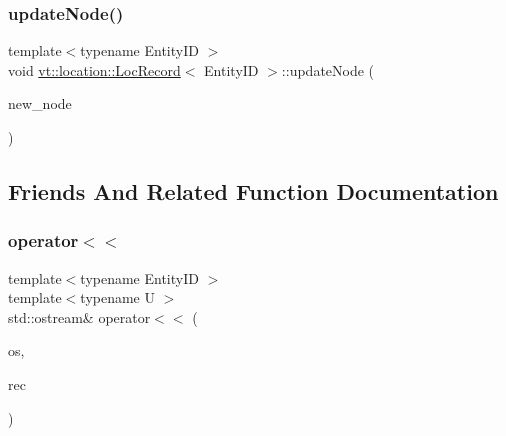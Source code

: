 \mbox{\label{structvt_1_1location_1_1_loc_record_aa66e4f13e89526636b87b3c950bdd91c}} 
\subsubsection{\texorpdfstring{update\+Node()}{updateNode()}}
{\footnotesize\ttfamily template$<$typename Entity\+ID $>$ \\
void \hyperlink{structvt_1_1location_1_1_loc_record}{vt\+::location\+::\+Loc\+Record}$<$ Entity\+ID $>$\+::update\+Node (\begin{DoxyParamCaption}\item[{\hyperlink{namespacevt_a866da9d0efc19c0a1ce79e9e492f47e2}{Node\+Type} const \&}]{new\+\_\+node }\end{DoxyParamCaption})}



\subsection{Friends And Related Function Documentation}
\mbox{\label{structvt_1_1location_1_1_loc_record_ac94f95ab9e7fa58002314e99696972d7}} 
\subsubsection{\texorpdfstring{operator$<$$<$}{operator<<}}
{\footnotesize\ttfamily template$<$typename Entity\+ID $>$ \\
template$<$typename U $>$ \\
std\+::ostream\& operator$<$$<$ (\begin{DoxyParamCaption}\item[{std\+::ostream \&}]{os,  }\item[{\hyperlink{structvt_1_1location_1_1_loc_record}{Loc\+Record}$<$ U $>$ const \&}]{rec }\end{DoxyParamCaption})\hspace{0.3cm}{\ttfamily [friend]}}



